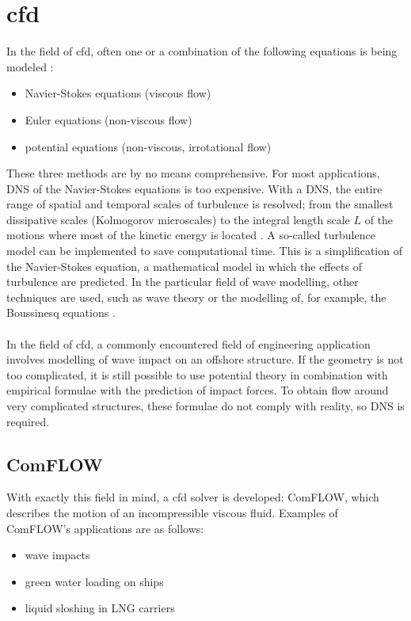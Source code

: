\section{\acrfull{cfd}}
In the field of \acrfull{cfd}, often one or a combination of the following equations is being modeled \citep{vanderPlas2017}:
\begin{itemize}
    \item Navier-Stokes equations (viscous flow)
    \item Euler equations (non-viscous flow) 
    \item potential equations (non-viscous, irrotational flow)
\end{itemize}
These three methods are by no means comprehensive. For most applications, \acrfull{DNS} of the Navier-Stokes equations is too expensive. With a \acrshort{DNS}, the entire range of spatial and temporal scales of turbulence is resolved; from the smallest dissipative scales (Kolmogorov microscales) to the integral length scale $L$ of the motions where most of the kinetic energy is located \citep{Westerweel_Turbulence2016}. A so-called turbulence model can be implemented to save computational time. This is a simplification of the Navier-Stokes equation, a mathematical model in which the effects of turbulence are predicted. 
In the particular field of wave modelling, other techniques are used, such as wave theory or the modelling of, for example, the Boussinesq equations \citep{vanderPlas2017}.\\
\\
In the field of \acrshort{cfd}, a commonly encountered field of engineering application involves modelling of wave impact on an offshore structure. If the geometry is not too complicated, it is still possible to use potential theory in combination with empirical formulae with the prediction of impact forces. To obtain flow around very complicated structures, these formulae do not comply with reality, so \acrshort{DNS} is required.

\subsection{ComFLOW}
\label{subsec: comflow literature review}
With exactly this field in mind, a \acrshort{cfd} solver is developed: ComFLOW, which describes the motion of an incompressible viscous fluid. Examples of ComFLOW's applications are as follows:
\begin{itemize}
    \item wave impacts
    \item green water loading on ships
    \item liquid sloshing in LNG carriers
\end{itemize}

